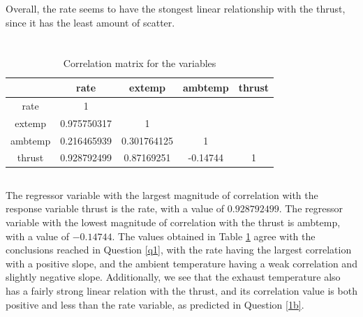 \documentclass[letterpaper]{article}
\begin{document}
Overall, the rate seems to have the stongest linear relationship with the thrust,
since it has
the least amount of scatter.

\section{}

\subsection{}

\begin{table}[H]
 \centering
 \begin{tabular}{c|c|c|c|c|}
          & rate        & extemp      & ambtemp  & thrust \\ \hline
  rate    & 1           &             &          &        \\ \hline
  extemp  & 0.975750317 & 1           &          &        \\ \hline
  ambtemp & 0.216465939 & 0.301764125 & 1        &        \\ \hline
  thrust  & 0.928792499 & 0.87169251  & -0.14744 & 1      \\ \hline
 \end{tabular}
 \caption{Correlation matrix for the variables}
 \label{correlationmatrix}
\end{table}

\subsection{}

The regressor variable with the largest magnitude of correlation with the response
variable thrust is the rate, with a value of $0.928792499$.
The regressor variable with the lowest magnitude of correlation with the thrust
is ambtemp, with a value of $-0.14744$.
The values obtained in Table \ref{correlationmatrix} agree
with the conclusions reached in Question \ref{q1}, with
the rate having the largest correlation with a positive slope, and the
ambient temperature having a weak correlation and slightly negative slope.
Additionally, we see that the exhaust temperature also has a fairly strong
linear relation with the thrust, and its correlation value is both positive and less than
the rate variable, as predicted in Question \ref{1b}.
\end{document}
